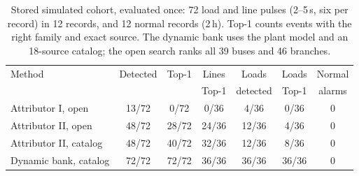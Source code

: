 \begin{table}[t]\centering\footnotesize
\caption{Stored simulated cohort, evaluated once: 72 load and line pulses (2--5\,s, six per record) in 12 records, and 12 normal records (2\,h). Top-1 counts events with the right family and exact source. The dynamic bank uses the plant model and an 18-source catalog; the open search ranks all 39 buses and 46 branches.}
\label{tab:allevents-sim}\setlength{\tabcolsep}{2.6pt}
\begin{tabular}{lcccccc}\toprule
Method & Detected & Top-1 & Lines & Loads & Loads & Normal \\
 & & & Top-1 & detected & Top-1 & alarms \\
\midrule
Attributor I, open & 13/72 & 0/72 & 0/36 & 4/36 & 0/36 & 0 \\
Attributor II, open & 48/72 & 28/72 & 24/36 & 12/36 & 4/36 & 0 \\
Attributor II, catalog & 48/72 & 40/72 & 32/36 & 12/36 & 8/36 & 0 \\
Dynamic bank, catalog & 72/72 & 72/72 & 36/36 & 36/36 & 36/36 & 0 \\
\bottomrule\end{tabular}\end{table}
